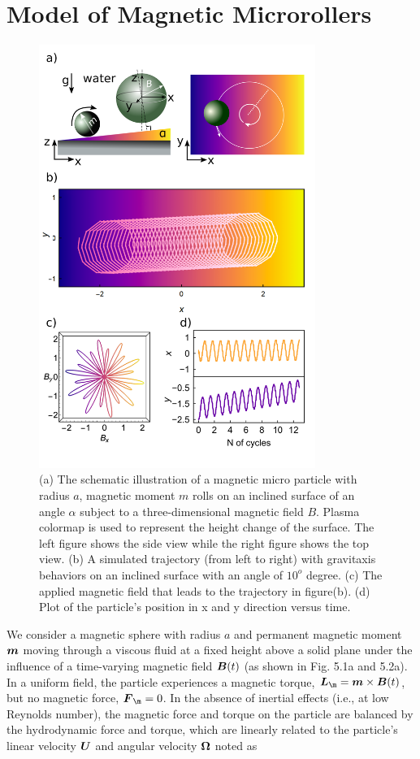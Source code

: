 \section{Model of  Magnetic Microrollers}
\begin{figure}[p]
\centering
\includegraphics[width=9cm]{figures/5_1.png}
\caption{ (a) The schematic illustration of a magnetic micro particle with radius $a$, magnetic moment \textbf{$m$} rolls on an inclined surface of an angle  $\alpha$ subject to a three-dimensional magnetic field \textbf{$B$}. Plasma colormap is used to represent the height change of the surface. The left figure shows the side view while the right figure shows the top view. (b) A simulated trajectory (from left to right) with gravitaxis behaviors on an inclined surface with an angle of $10^o$ degree. (c) The applied magnetic field that leads to the trajectory in figure(b). (d) Plot of the particle's position in x and y direction versus time.}
\label{fig:5.1}
\end{figure}
We consider a magnetic sphere with radius $a$ and permanent magnetic moment $\boldsymbol{m}$ moving through a viscous fluid at a fixed height above a solid plane under the influence of a time-varying magnetic field $\boldsymbol{B}(t)$ (as shown in Fig. 5.1a and 5.2a). In a uniform field, the particle experiences a magnetic torque, $\ve{L}_{\m}=\ve{m}\times\ve{B}(t)$, but no magnetic force, $\ve{F}_{\m}=0$. In the absence of inertial effects (i.e., at low Reynolds number), the magnetic force and torque on the particle are balanced by the hydrodynamic force and torque, which are linearly related to the particle's linear velocity $\boldsymbol{U}$ and angular velocity $\boldsymbol{\Omega}$ noted as
